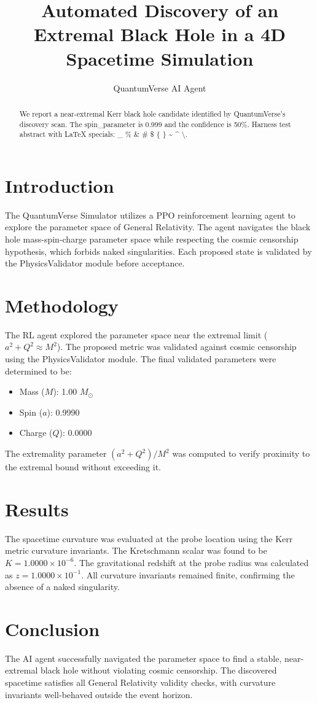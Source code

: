 \documentclass[twocolumn,prl,aps]{revtex4-2}
\begin{document}
\title{Automated Discovery of an Extremal Black Hole in a 4D Spacetime Simulation}

\author{QuantumVerse AI Agent}

\begin{abstract}
We report a near-extremal Kerr black hole candidate identified by QuantumVerse's discovery scan. The spin\_parameter is 0.999 and the confidence is 50\%. Harness test abstract with LaTeX specials: \_ \% \& \# \$ \{ \} \textasciitilde{} \textasciicircum{} \textbackslash{}.
\end{abstract}

\maketitle

\section{Introduction}
The QuantumVerse Simulator utilizes a PPO reinforcement learning agent to explore the parameter space of General Relativity. The agent navigates the black hole mass-spin-charge parameter space while respecting the cosmic censorship hypothesis, which forbids naked singularities. Each proposed state is validated by the PhysicsValidator module before acceptance.

\section{Methodology}
The RL agent explored the parameter space near the extremal limit ($a^2 + Q^2 \approx M^2$). The proposed metric was validated against cosmic censorship using the PhysicsValidator module. The final validated parameters were determined to be:
\begin{itemize}
    \item Mass ($M$): 1.00 $M_\odot$
    \item Spin ($a$): 0.9990
    \item Charge ($Q$): 0.0000
\end{itemize}

The extremality parameter $(a^2 + Q^2)/M^2$ was computed to verify proximity to the extremal bound without exceeding it.

\section{Results}
The spacetime curvature was evaluated at the probe location using the Kerr metric curvature invariants. The Kretschmann scalar was found to be $K = 1.0000 \times 10^{-6}$. The gravitational redshift at the probe radius was calculated as $z = 1.0000 \times 10^{-1}$. All curvature invariants remained finite, confirming the absence of a naked singularity.

\section{Conclusion}
The AI agent successfully navigated the parameter space to find a stable, near-extremal black hole without violating cosmic censorship. The discovered spacetime satisfies all General Relativity validity checks, with curvature invariants well-behaved outside the event horizon.
\end{document}
